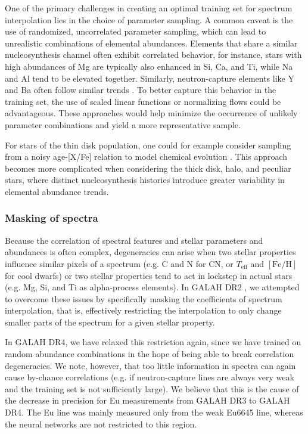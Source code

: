 \documentclass[
  journal=pasa,
  manuscript=research-paper, %
  year=2024,
  volume=37
]{cup-journal}
\newcommand{\Teff}{$T_\mathrm{eff}$\xspace}
\newcommand{\feh}{$\mathrm{[Fe/H]}$\xspace}
\begin{document}
One of the primary challenges in creating an optimal training set for spectrum interpolation lies in the choice of parameter sampling. A common caveat is the use of randomized, uncorrelated parameter sampling, which can lead to unrealistic combinations of elemental abundances. Elements that share a similar nucleosynthesis channel often exhibit correlated behavior, for instance, stars with high abundances of Mg are typically also enhanced in Si, Ca, and Ti, while Na and Al tend to be elevated together. Similarly, neutron-capture elements like Y and Ba often follow similar trends \citep[e.g.][]{Ting2012, Kobayashi2020, Buder2021}. To better capture this behavior in the training set, the use of scaled linear functions or normalizing flows could be advantageous. These approaches would help minimize the occurrence of unlikely parameter combinations and yield a more representative sample. 

For stars of the thin disk population, one could for example consider sampling from a noisy age-[X/Fe] relation to model chemical evolution \citep[see Fig.~\ref{fig:galah_dr4_age_xfe_trends_solar_twins_allstar}][]{Nissen2015, Spina2016, Bedell2018}. This approach becomes more complicated when considering the thick disk, halo, and peculiar stars, where distinct nucleosynthesis histories introduce greater variability in elemental abundance trends.

\subsubsection{Masking of spectra}

Because the correlation of spectral features and stellar parameters and abundances is often complex, degeneracies can arise when two stellar properties influence similar pixels of a spectrum (e.g. C and N for CN, or \Teff and \feh for cool dwarfs) or two stellar properties tend to act in lockstep in actual stars (e.g. Mg, Si, and Ti as alpha-process elements). In GALAH DR2 \citep{Buder2018}, we attempted to overcome these issues by specifically masking the coefficients of spectrum interpolation, that is, effectively restricting the interpolation to only change smaller parts of the spectrum for a given stellar property.

In GALAH DR4, we have relaxed this restriction again, since we have trained on random abundance combinations in the hope of being able to break correlation degeneracies. We note, however, that too little information in spectra can again cause by-chance correlations (e.g. if neutron-capture lines are always very weak and the training set is not sufficiently large). We believe that this is the cause of the decrease in precision for Eu measurements from GALAH DR3 to GALAH DR4. The Eu line was mainly measured only from the weak Eu6645 line, whereas the neural networks are not restricted to this region.
\end{document}
